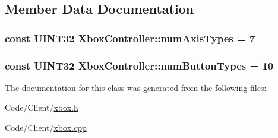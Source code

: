 \subsection{\-Member \-Data \-Documentation}
\hypertarget{class_xbox_controller_a3c057c67c58445ef06e67e4abc4c8b63}{
\subsubsection[{num\-Axis\-Types}]{\setlength{\rightskip}{0pt plus 5cm}const \-U\-I\-N\-T32 {\bf \-Xbox\-Controller\-::num\-Axis\-Types} = 7}}\label{class_xbox_controller_a3c057c67c58445ef06e67e4abc4c8b63}
\hypertarget{class_xbox_controller_a41eb8f23c5f4e4fd9a9807d8ff0adbea}{
\subsubsection[{num\-Button\-Types}]{\setlength{\rightskip}{0pt plus 5cm}const \-U\-I\-N\-T32 {\bf \-Xbox\-Controller\-::num\-Button\-Types} = 10}}\label{class_xbox_controller_a41eb8f23c5f4e4fd9a9807d8ff0adbea}


\-The documentation for this class was generated from the following files\-:\begin{DoxyCompactItemize}
\item 
\-Code/\-Client/\hyperlink{xbox_8h}{xbox.\-h}\item 
\-Code/\-Client/\hyperlink{xbox_8cpp}{xbox.\-cpp}\end{DoxyCompactItemize}

